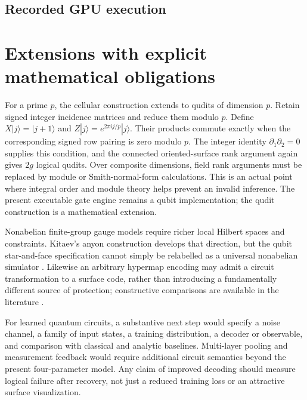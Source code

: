 \subsection{Recorded GPU execution}


\section{Extensions with explicit mathematical obligations}

For a prime $p$, the cellular construction extends to qudits of dimension
$p$.  Retain signed integer incidence matrices and reduce them modulo
$p$.  Define $X|j\rangle=|j+1\rangle$ and
$Z|j\rangle=e^{2\pi i j/p}|j\rangle$.  Their products commute exactly
when the corresponding signed row pairing is zero modulo $p$.
The integer identity $\partial_1\partial_2=0$ supplies this condition,
and the connected oriented-surface rank argument again gives $2g$
logical qudits.  Over composite dimensions, field rank arguments must
be replaced by module or Smith-normal-form calculations.  This is an
actual point where integral order and module theory helps prevent an
invalid inference.  The present executable gate engine remains a qubit
implementation; the qudit construction is a mathematical extension.

Nonabelian finite-group gauge models require richer local Hilbert spaces
and constraints.  Kitaev's anyon construction develops that direction,
but the qubit star-and-face specification cannot simply be relabelled as
a universal nonabelian simulator \cite{QSKitaev2003}.  Likewise an
arbitrary hypermap encoding may admit a circuit transformation to a
surface code, rather than introducing a fundamentally different source
of protection; constructive comparisons are available in the literature
\cite{QSSarvepalli2014}.

For learned quantum circuits, a substantive next step would specify a
noise channel, a family of input states, a training distribution, a
decoder or observable, and comparison with classical and analytic
baselines.  Multi-layer pooling and measurement feedback would require
additional circuit semantics beyond the present four-parameter model.
Any claim of improved decoding should measure logical failure after
recovery, not just a reduced training loss or an attractive surface
visualization.

